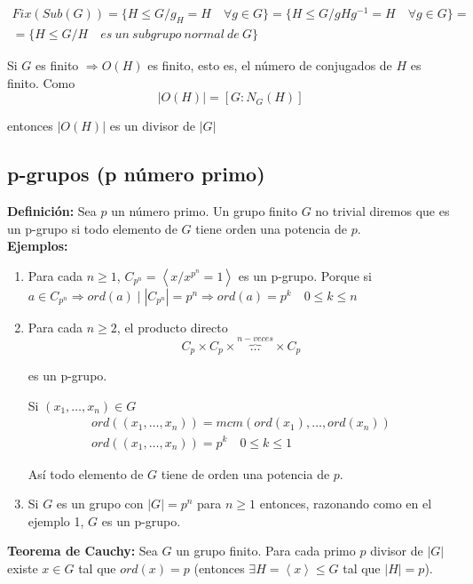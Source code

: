 \documentclass{article}
\begin{document}
\begin{gather*}
Fix(Sub(G))=\{H\leq G/g_H=H\quad \forall g\in G\}=\{H\leq G/gHg^{-1}=H\quad \forall g\in G\}=\\
=\{H\leq G/H\quad es\:un\:subgrupo\:normal\:de\:G\}
\end{gather*}

Si $G$ es finito $\Rightarrow O(H)$ es finito, esto es, el número de conjugados de $H$ es finito. Como
\begin{equation*}
|O(H)|=\left[G:N_G(H)\right]
\end{equation*}

entonces $|O(H)|$ es un divisor de $|G|$

\subsection{p-grupos (p número primo)}
\textbf{Definición:} Sea $p$ un número primo. Un grupo finito $G$ no trivial diremos que es un p-grupo si todo elemento de $G$ tiene orden una potencia de $p$. \\

\textbf{Ejemplos:}\begin{enumerate}[1)]
\item Para cada $n\geq 1$, $C_{p^n}=\left\langle x/x^{p^n}=1\right\rangle$ es un p-grupo. Porque si $a\in C_{p^n}\Rightarrow ord(a)\mid |C_{p^n}|=p^n\Rightarrow ord(a)=p^k\quad 0\leq k\leq n$ 

\item Para cada $n\geq 2$, el producto directo
\begin{equation*}
C_p\times C_p\times \overbrace{\ldots}^{n-veces}\times C_p
\end{equation*}

es un p-grupo.

Si $(x_1,\ldots,x_n)\in G$
\begin{gather*}
ord((x_1,\ldots,x_n))=mcm(ord(x_1),\ldots,ord(x_n)) \\
ord((x_1,\ldots,x_n))=p^k\quad 0\leq k\leq 1
\end{gather*}

Así todo elemento de $G$ tiene de orden una potencia de $p$. 

\item Si $G$ es un grupo con $|G|=p^n$ para $n\geq 1$ entonces, razonando como en el ejemplo 1, $G$ es un p-grupo.
\end{enumerate}

\textbf{Teorema de Cauchy:} Sea $G$ un grupo finito. Para cada primo $p$ divisor de $|G|$ existe $x\in G$ tal que $ord(x)=p$ (entonces $\exists H=\left\langle x\right\rangle \leq G$ tal que $|H|=p$). \\
\end{document}
